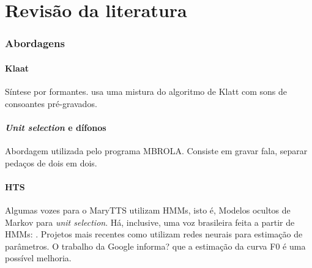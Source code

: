 

\chapter{Revisão da literatura}



\subsection{Abordagens}
\subsubsection{Klaat}
Síntese por formantes. \cite{espeakng} usa uma mistura do algoritmo de Klatt com
sons de consoantes pré-gravados.
\subsubsection{\emph{Unit selection} e dífonos}
Abordagem utilizada pelo programa MBROLA. Consiste em gravar fala, separar
pedaços de dois em dois.

\subsubsection{HTS}
Algumas vozes para o MaryTTS \cite{marytts} utilizam HMMs, isto é, Modelos
ocultos de Markov para \emph{unit selection}. Há, inclusive, uma voz brasileira
feita a partir de HMMs: \cite{couto}.
Projetos mais recentes como \cite{merlin,dnngoogle} utilizam redes neurais para
estimação de parâmetros. O trabalho da Google informa? que a estimação da curva
F0 é uma possível melhoria.


